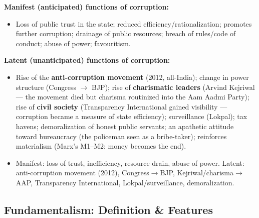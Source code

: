 \begin{ExampleBox}
\textbf{Manifest (anticipated) functions of corruption:}
\begin{itemize}
\item Loss of public trust in the state; reduced efficiency/rationalization; promotes further corruption; drainage of public resources; breach of rules/code of conduct; abuse of power; favouritism.
\end{itemize}
\end{ExampleBox}

\begin{ExampleBox}
\textbf{Latent (unanticipated) functions of corruption:}
\begin{itemize}
\item Rise of the \textbf{anti-corruption movement} (2012, all-India); change in power structure (Congress $\rightarrow$ BJP); rise of \textbf{charismatic leaders} (Arvind Kejriwal --- the movement died but charisma routinized into the Aam Aadmi Party); rise of \textbf{civil society} (Transparency International gained visibility --- corruption became a measure of state efficiency); surveillance (Lokpal); tax havens; demoralization of honest public servants; an apathetic attitude toward bureaucracy (the policeman seen as a bribe-taker); reinforces materialism (Marx's M1--M2: money becomes the end).
\end{itemize}
\end{ExampleBox}

\begin{QuickRevision}
\begin{itemize}
\item Manifest: loss of trust, inefficiency, resource drain, abuse of power. Latent: anti-corruption movement (2012), Congress$\rightarrow$BJP, Kejriwal/charisma$\rightarrow$AAP, Transparency International, Lokpal/surveillance, demoralization.
\end{itemize}
\end{QuickRevision}

\sectiondivider

\subsection{Fundamentalism: Definition \& Features}

